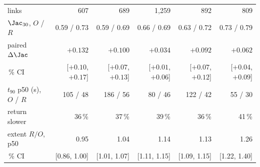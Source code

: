 \begin{tabular}{lrrrrr}
links & 607 & 689 & 1,259 & 892 & 809 \\
$\Jac_{30}$, $O$ / $R$ & 0.59 / 0.73 & 0.59 / 0.69 & 0.66 / 0.69 & 0.63 / 0.72 & 0.73 / 0.79 \\
paired $\Delta\Jac$ & $+0.132$ & $+0.100$ & $+0.034$ & $+0.092$ & $+0.062$ \\
\quad 95\,\% CI & [$+0.10$, $+0.17$] & [$+0.07$, $+0.13$] & [$+0.01$, $+0.06$] & [$+0.07$, $+0.12$] & [$+0.04$, $+0.09$] \\
$t_{90}$ p50 (s), $O$ / $R$ & 105 / 48 & 186 / 56 & 80 / 46 & 122 / 42 & 55 / 30 \\
return slower & 36\,\% & 37\,\% & 39\,\% & 36\,\% & 41\,\% \\
extent $R/O$, p50 & 0.95 & 1.04 & 1.14 & 1.13 & 1.26 \\
\quad 95\,\% CI & [0.86, 1.00] & [1.01, 1.07] & [1.11, 1.15] & [1.09, 1.15] & [1.22, 1.40] \\
\bottomrule
\end{tabular}
